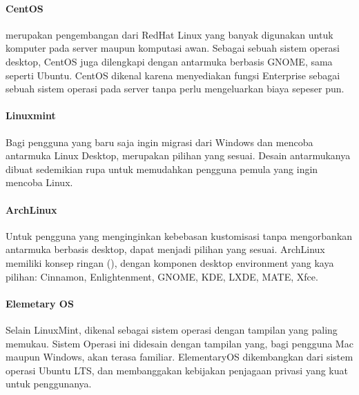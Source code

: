 \documentclass[letterpaper,10pt,english]{sphinxmanual}
\begin{document}
\paragraph{CentOS}
\label{\detokenize{sesi1/pengantarlinux:centos}}
 merupakan pengembangan dari RedHat Linux yang banyak digunakan untuk komputer pada server maupun komputasi awan. Sebagai sebuah sistem operasi desktop, CentOS juga dilengkapi dengan antarmuka berbasis GNOME, sama seperti Ubuntu. CentOS dikenal karena menyediakan fungsi Enterprise sebagai sebuah sistem operasi pada server tanpa perlu mengeluarkan biaya sepeser pun.



\paragraph{Linuxmint}
\label{\detokenize{sesi1/pengantarlinux:linuxmint}}
Bagi pengguna yang baru saja ingin migrasi dari Windows dan mencoba antarmuka Linux Desktop,  merupakan pilihan yang sesuai. Desain antarmukanya dibuat sedemikian rupa untuk memudahkan pengguna pemula yang ingin mencoba Linux.


\paragraph{ArchLinux}
\label{\detokenize{sesi1/pengantarlinux:archlinux}}
Untuk pengguna yang menginginkan kebebasan kustomisasi tanpa mengorbankan antarmuka berbasis desktop,  dapat menjadi pilihan yang sesuai. ArchLinux memiliki konsep ringan (), dengan komponen desktop environment yang kaya pilihan: Cinnamon, Enlightenment, GNOME, KDE, LXDE, MATE, Xfce.



\paragraph{Elemetary OS}
\label{\detokenize{sesi1/pengantarlinux:elemetary-os}}
Selain LinuxMint,  dikenal sebagai sistem operasi dengan tampilan yang paling memukau. Sistem Operasi ini didesain dengan tampilan yang, bagi pengguna Mac maupun Windows, akan terasa familiar. ElementaryOS dikembangkan dari sistem operasi Ubuntu LTS, dan membanggakan kebijakan penjagaan privasi yang kuat untuk penggunanya.
\end{document}
